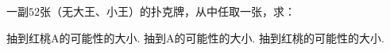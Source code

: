 一副$52$张（无大王、小王）的扑克牌，从中任取一张，求：
\begin{subquestions}
\subquestion 抽到红桃A的可能性的大小.
\subquestion 抽到A的可能性的大小.
\subquestion 抽到红桃的可能性的大小.
\end{subquestions}